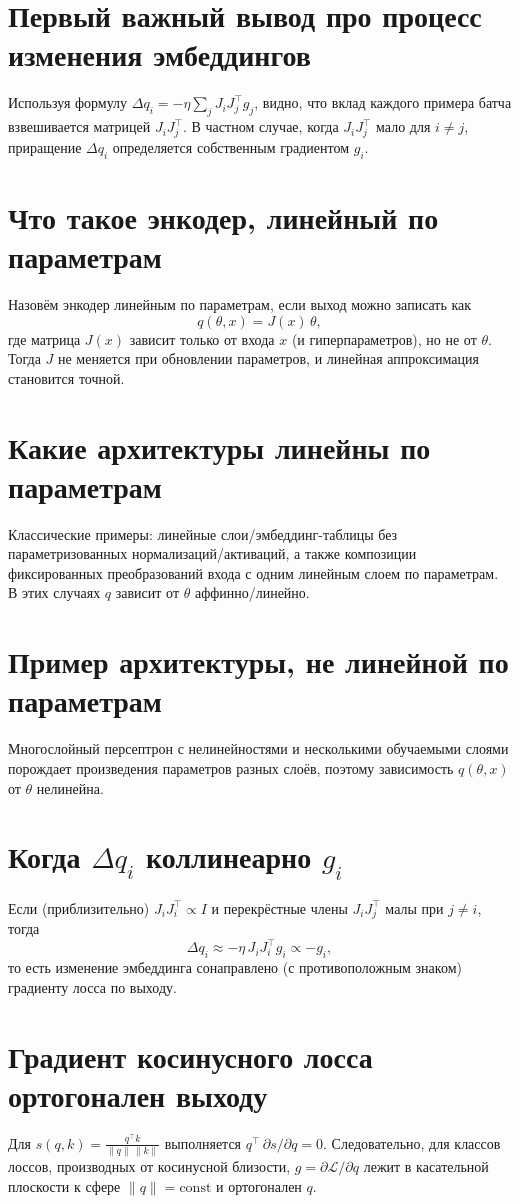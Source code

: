\section{Первый важный вывод про процесс изменения эмбеддингов}
Используя формулу \(\Delta q_i = -\eta\sum_j J_i J_j^{\top} g_j\), видно, что вклад каждого примера батча взвешивается матрицей \(J_i J_j^{\top}\). В частном случае, когда \(J_i J_j^{\top}\) мало для \(i\ne j\), приращение \(\Delta q_i\) определяется собственным градиентом \(g_i\).

\section{Что такое энкодер, линейный по параметрам}
Назовём энкодер линейным по параметрам, если выход можно записать как
\[
q(\theta, x) = J(x)\,\theta,
\]
где матрица \(J(x)\) зависит только от входа \(x\) (и гиперпараметров), но не от \(\theta\). Тогда \(J\) не меняется при обновлении параметров, и линейная аппроксимация становится точной.

\section{Какие архитектуры линейны по параметрам}
Классические примеры: линейные слои/эмбеддинг-таблицы без параметризованных нормализаций/активаций, а также композиции фиксированных преобразований входа с одним линейным слоем по параметрам. В этих случаях \(q\) зависит от \(\theta\) аффинно/линейно.

\section{Пример архитектуры, не линейной по параметрам}
Многослойный персептрон с нелинейностями и несколькими обучаемыми слоями порождает произведения параметров разных слоёв, поэтому зависимость \(q(\theta,x)\) от \(\theta\) нелинейна.

\section{Когда \(\Delta q_i\) коллинеарно \(g_i\)}
Если (приблизительно) \(J_i J_i^{\top} \propto I\) и перекрёстные члены \(J_i J_j^{\top}\) малы при \(j\ne i\), тогда
\[
\Delta q_i \approx -\eta\, J_i J_i^{\top} g_i \propto -g_i,
\]
то есть изменение эмбеддинга сонаправлено (с противоположным знаком) градиенту лосса по выходу.

\section{Градиент косинусного лосса ортогонален выходу}
Для \(s(q,k)=\tfrac{q^{\top}k}{\|q\|\,\|k\|}\) выполняется \(q^{\top}\,\partial s/\partial q = 0\). Следовательно, для классов лоссов, производных от косинусной близости, \(g=\partial \mathcal{L}/\partial q\) лежит в касательной плоскости к сфере \(\|q\|=\text{const}\) и ортогонален \(q\).

